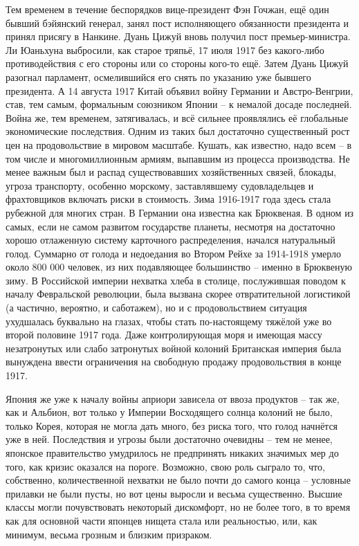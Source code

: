 Тем временем в течение беспорядков вице-президент Фэн Гочжан, ещё один бывший бэйянский генерал, занял пост исполняющего обязанности президента и принял присягу в Нанкине. Дуань Цижуй вновь получил пост премьер-министра. Ли Юаньхуна выбросили, как старое тряпьё, 17 июля 1917 без какого-либо противодействия с его стороны или со стороны кого-то ещё. Затем Дуань Цижуй разогнал парламент, осмелившийся его снять по указанию уже бывшего президента. А 14 августа 1917 Китай объявил войну Германии и Австро-Венгрии, став, тем самым, формальным союзником Японии – к немалой досаде последней. Война же, тем временем, затягивалась, и всё сильнее проявлялись её глобальные экономические последствия. Одним из таких был достаточно существенный рост цен на продовольствие в мировом масштабе. Кушать, как известно, надо всем – в том числе и многомиллионным армиям, выпавшим из процесса производства. Не менее важным был и распад существовавших хозяйственных связей, блокады, угроза транспорту, особенно морскому, заставлявшему судовладельцев и фрахтовщиков включать риски в стоимость. Зима 1916-1917 года здесь стала рубежной для многих стран. В Германии она известна как Брюквеная. В одном из самых, если не самом развитом государстве планеты, несмотря на достаточно хорошо отлаженную систему карточного распределения, начался натуральный голод. Суммарно от голода и недоедания во Втором Рейхе за 1914-1918 умерло около 800 000 человек, из них подавляющее большинство – именно в Брюквеную зиму. В Российской империи нехватка хлеба в столице, послужившая поводом к началу Февральской революции, была вызвана скорее отвратительной логистикой (а частично, вероятно, и саботажем), но и с продовольствием ситуация ухудшалась буквально на глазах, чтобы стать по-настоящему тяжёлой уже во второй половине 1917 года. Даже контролирующая моря и имеющая массу незатронутых или слабо затронутых войной колоний Британская империя была вынуждена ввести ограничения на свободную продажу продовольствия в конце 1917.

Япония же уже к началу войны априори зависела от ввоза продуктов – так же, как и Альбион, вот только у Империи Восходящего солнца колоний не было, только Корея, которая не могла дать много, без риска того, что голод начнётся уже в ней. Последствия и угрозы были достаточно очевидны – тем не менее, японское правительство умудрилось не предпринять никаких значимых мер до того, как кризис оказался на пороге. Возможно, свою роль сыграло то, что, собственно, количественной нехватки не было почти до самого конца – условные прилавки не были пусты, но вот цены выросли и весьма существенно. Высшие классы могли почувствовать некоторый дискомфорт, но не более того, в то время как для основной части японцев нищета стала или реальностью, или, как минимум, весьма грозным и близким призраком.


